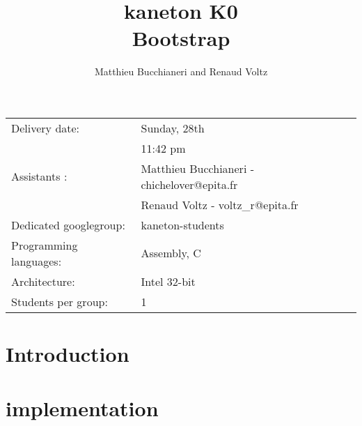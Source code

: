 
%
%


\usepackage{pdfpages}

%
%


%
%

\title{kaneton K0\\Bootstrap}

%
%

\author{\small{Matthieu Bucchianeri} and
        \small{Renaud Voltz}}

%
%



\maketitle

\vspace{5mm}

\begin{tabular}{p{7cm}l}
Delivery date: & Sunday, 28th \\
               & 11:42 pm \\
Assistants : & Matthieu Bucchianeri - \small{chichelover@epita.fr} \\
             & Renaud Voltz - \small{voltz\_r@epita.fr} \\
Dedicated googlegroup: & kaneton-students \\
Programming languages: & Assembly, C \\
Architecture: & Intel 32-bit \\
Students per group: & 1
\end{tabular}

\section*{Introduction}

\newpage


\section*{implementation}


